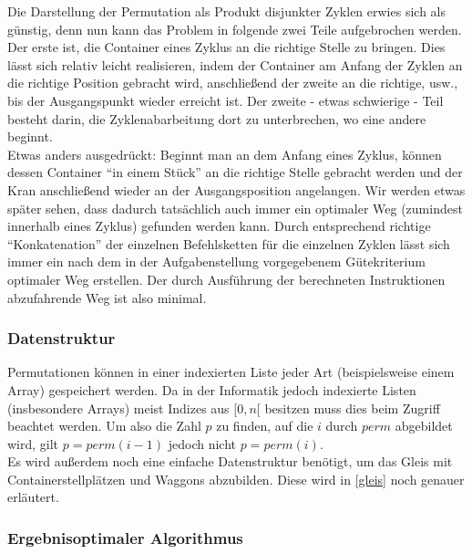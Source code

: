 Die Darstellung der Permutation als Produkt disjunkter Zyklen erwies sich als günstig,
denn nun kann das Problem in folgende zwei Teile aufgebrochen werden.
Der erste ist, die Container eines Zyklus an die richtige Stelle zu bringen.
Dies lässt sich relativ leicht realisieren, indem der Container am Anfang der Zyklen an die richtige Position gebracht wird,
anschließend der zweite an die richtige, usw., bis der Ausgangspunkt wieder erreicht ist.
Der zweite - etwas schwierige - Teil besteht darin, die Zyklenabarbeitung dort zu unterbrechen, wo eine andere beginnt. \\
Etwas anders ausgedrückt:
Beginnt man an dem Anfang eines Zyklus, können dessen Container ``in einem Stück'' an die richtige Stelle gebracht werden
 und der Kran anschließend wieder an der Ausgangsposition angelangen.
Wir werden etwas später sehen, dass dadurch tatsächlich auch immer ein optimaler Weg (zumindest innerhalb eines Zyklus) gefunden werden kann.
Durch entsprechend richtige ``Konkatenation'' der einzelnen Befehlsketten für die einzelnen Zyklen lässt sich immer
 ein nach dem in der Aufgabenstellung vorgegebenem Gütekriterium optimaler Weg erstellen.
Der durch Ausführung der berechneten Instruktionen abzufahrende Weg ist also minimal.
\subsubsection{Datenstruktur}
Permutationen können in einer indexierten Liste jeder Art (beispielsweise einem Array) gespeichert werden.
Da in der Informatik jedoch indexierte Listen (insbesondere Arrays) meist Indizes aus $[0,n[$ besitzen muss dies beim Zugriff beachtet werden.
Um also die Zahl $p$ zu finden, auf die $i$ durch $perm$ abgebildet wird, gilt $p = perm(i-1)$ jedoch nicht $p = perm(i)$. \\
Es wird außerdem noch eine einfache Datenstruktur benötigt, um das Gleis mit Containerstellplätzen und Waggons abzubilden.
Diese wird in \ref{gleis} noch genauer erläutert.
\subsubsection{Ergebnisoptimaler Algorithmus}
